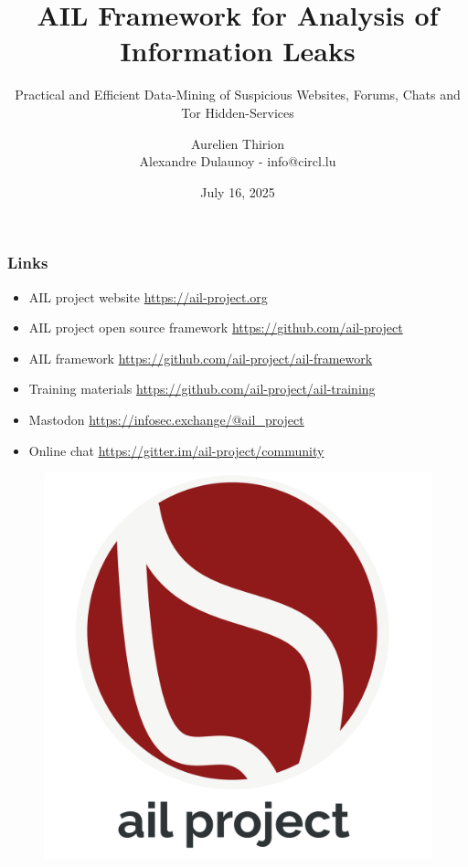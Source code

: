\documentclass[10pt,aspectratio=169, colorlinks=true, linkcolor=circlBlue]{beamer}
\title{AIL Framework for Analysis of Information Leaks}
\subtitle{Practical and Efficient Data-Mining of Suspicious Websites, Forums, Chats and Tor Hidden-Services}
\date{July 16, 2025}
\author{Aurelien Thirion\\Alexandre Dulaunoy - info@circl.lu}
\institute{CIRCL \normalurl{https://www.circl.lu}}
\begin{document}



\begin{frame}
	\titlepage%
\end{frame}




\begin{frame}
\frametitle{Links}
    \begin{itemize}
        \item AIL project website \url{https://ail-project.org}
        \item AIL project open source framework \url{https://github.com/ail-project}
        \item AIL framework \url{https://github.com/ail-project/ail-framework}
        \item Training materials \url{https://github.com/ail-project/ail-training}
	\item Mastodon \url{https://infosec.exchange/@ail_project}
        \item Online chat \url{https://gitter.im/ail-project/community}
    \end{itemize}
    \begin{figure}
        \includegraphics[scale=0.1, angle=0]{images/ail-project.png}
    \end{figure}
\end{frame}
\end{document}
